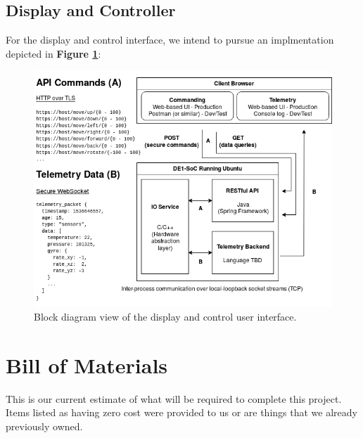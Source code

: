 \documentclass{article}
\begin{document}

\pagebreak

\subsection{Display and Controller}

For the display and control interface, we intend to pursue an
implmentation depicted in \textbf{Figure \ref{fig:display_controller}}:

\begin{figure}[H]
	\centering
	\includegraphics[width=\linewidth]{../src/im/display_controller}
	\caption{Block diagram view of the display and control user
		interface.}
	\label{fig:display_controller}
\end{figure}


\pagebreak

\section{Bill of Materials}

This is our current estimate of what will be required to complete this
project. Items listed as having zero cost were provided to us or are things
that we already previously owned.
\end{document}
